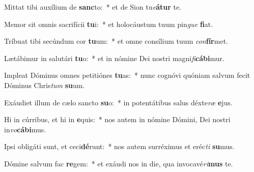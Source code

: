 \item Mittat tibi auxílium de \textbf{sanc}to:~* et de Sion tu\textit{e}\textbf{á}\textbf{tur} te.
\item Memor sit omnis sacrifícii \textbf{tu}i:~* et holocáustum tuum pin\textit{gue} \textbf{fi}at.
\item Tríbuat tibi secúndum cor \textbf{tu}um:~* et omne consílium tuum \textit{con}\textbf{fír}met.
\item Lætábimur in salutári \textbf{tu}o:~* et in nómine Dei nostri magni\textit{fi}\textbf{cá}\textbf{bi}mur.
\item Impleat Dóminus omnes petitiónes \textbf{tu}as:~* nunc cognóvi quóniam salvum fecit Dóminus Chris\textit{tum} \textbf{su}um.
\item Exáudiet illum de cælo sancto \textbf{su}o:~* in potentátibus salus déxte\textit{ræ} \textbf{e}jus.
\item Hi in cúrribus, et hi in \textbf{e}quis:~* nos autem in nómine Dómini, Dei nostri in\textit{vo}\textbf{cá}\textbf{bi}mus.
\item Ipsi obligáti sunt, et ceci\textbf{dé}runt:~* nos autem surréximus et eréc\textit{ti} \textbf{su}mus.
\item Dómine salvum fac \textbf{re}gem:~* et exáudi nos in die, qua invocavé\textit{ri}\textbf{mus} te.
